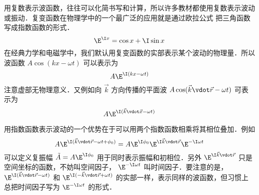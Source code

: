 

用复数表示波函数，往往可以化简书写和计算，所以许多教材都使用复数表示波动或振动．复变函数在物理学中的一个最广泛的应用就是通过欧拉公式%
把三角函数写成指数函数的形式．
\begin{equation}%
\E^{\I x} = \cos x + \I\sin x 
\end{equation} 
在经典力学和电磁学中，我们默认用复变函数的实部表示某个波动的物理量．所以波函数 $A\cos (kx - \omega t)$ 可以表示为
\begin{equation}
A \E^{\I( kx - \omega t )}
\end{equation}
注意虚部无物理意义．又例如向 $\vec k$ 方向传播的平面波 $A\cos( \vec k\vdot\vec r - \omega t )$ 可表示为
\begin{equation}
A \E^{\I( \vec k \vdot \vec x - \omega t )}
\end{equation}

用指数函数表示波动的一个优势在于可以用两个指数函数相乘将其相位叠加．例如
\begin{equation}
A \E^{\I( \vec k \vdot \vec r - \omega t + \phi _0 )} = A \E^{\I \phi _0} \E^{\I\vec k \vdot \vec r} \E^{ - \I\omega t}
\end{equation}
可以定义复振幅 $\tilde A = A \E^{\I \phi _0}$ 用于同时表示振幅和初相位．另外 $\E^{\I\vec k \vdot \vec r}$ 只是空间坐标的函数，不妨叫空间因子， $\E^{ - \I\omega t}$ 叫时间因子．要注意的是， $\E^{\I( \vec k \vdot \vec r - \omega t )}$ 和 $\E^{\I(  - \vec k \vdot \vec r + \omega t )}$ 的实部一样，表示同样的波函数，但习惯上总把时间因子写为 $\E^{ - \I\omega t}$ 的形式．












